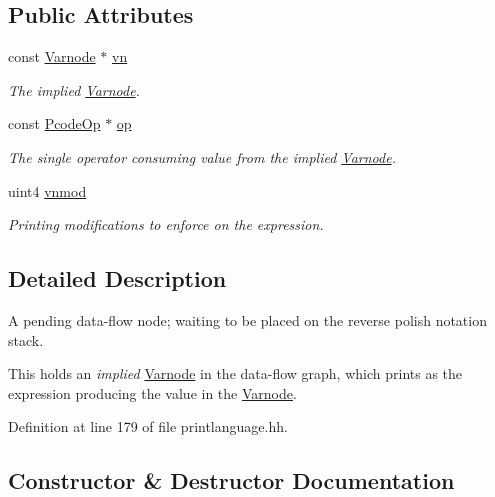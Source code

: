 \subsection*{Public Attributes}
\begin{DoxyCompactItemize}
\item 
const \mbox{\hyperlink{class_varnode}{Varnode}} $\ast$ \mbox{\hyperlink{struct_print_language_1_1_node_pending_ae0010f0e2a1595e804fac743c52d61b0}{vn}}
\begin{DoxyCompactList}\small\item\em The implied \mbox{\hyperlink{class_varnode}{Varnode}}. \end{DoxyCompactList}\item 
const \mbox{\hyperlink{class_pcode_op}{Pcode\+Op}} $\ast$ \mbox{\hyperlink{struct_print_language_1_1_node_pending_a3f2183bccb0f2163cce4f598d44760d4}{op}}
\begin{DoxyCompactList}\small\item\em The single operator consuming value from the implied \mbox{\hyperlink{class_varnode}{Varnode}}. \end{DoxyCompactList}\item 
uint4 \mbox{\hyperlink{struct_print_language_1_1_node_pending_aba9c0cf6dcd3d4f86976c8ab0e097839}{vnmod}}
\begin{DoxyCompactList}\small\item\em Printing modifications to enforce on the expression. \end{DoxyCompactList}\end{DoxyCompactItemize}


\subsection{Detailed Description}
A pending data-\/flow node; waiting to be placed on the reverse polish notation stack. 

This holds an {\itshape implied} \mbox{\hyperlink{class_varnode}{Varnode}} in the data-\/flow graph, which prints as the expression producing the value in the \mbox{\hyperlink{class_varnode}{Varnode}}. 

Definition at line 179 of file printlanguage.\+hh.



\subsection{Constructor \& Destructor Documentation}
\mbox{\label{struct_print_language_1_1_node_pending_a900ea3ad753bfed285208b4ac9cfc4c6}} 
